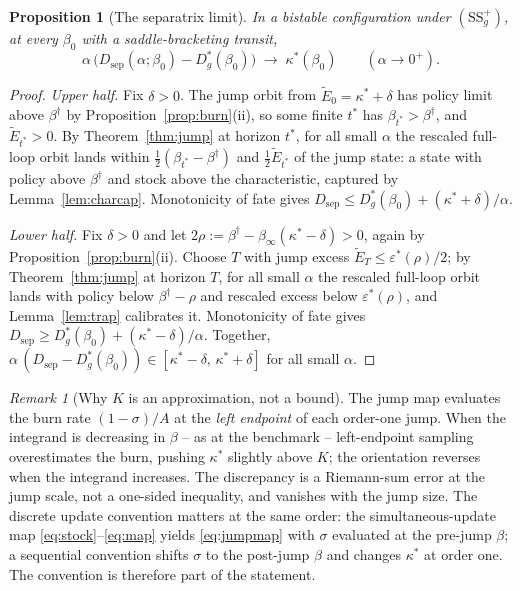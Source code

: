 \documentclass[11pt]{article}
\newtheorem{proposition}[theorem]{Proposition}
\theoremstyle{definition}
\theoremstyle{remark}
\newtheorem{remark}[theorem]{Remark}
\numberwithin{equation}{section}
\begin{document}
\begin{proposition}[The separatrix limit]\label{prop:seplimit}
In a bistable configuration under $(\mathrm{SS}^+_g)$, at every $\beta_0$ with a saddle-bracketing transit,
\[
\alpha\,\bigl(D_{\mathrm{sep}}(\alpha;\beta_0)-D^\ast_g(\beta_0)\bigr)\;\longrightarrow\;\kappa^\ast(\beta_0)
\qquad (\alpha \to 0^+).
\]
\end{proposition}
\begin{proof}
\emph{Upper half.} Fix $\delta > 0$. The jump orbit from $\tilde E_0 = \kappa^\ast+\delta$ has policy limit above $\beta^\dagger$ by Proposition~\ref{prop:burn}(ii), so some finite $t^\ast$ has $\beta_{t^\ast} > \beta^\dagger$, and $\tilde E_{t^\ast} > 0$. By Theorem~\ref{thm:jump} at horizon $t^\ast$, for all small $\alpha$ the rescaled full-loop orbit lands within $\tfrac12(\beta_{t^\ast}-\beta^\dagger)$ and $\tfrac12\tilde E_{t^\ast}$ of the jump state: a state with policy above $\beta^\dagger$ and stock above the characteristic, captured by Lemma~\ref{lem:charcap}. Monotonicity of fate gives $D_{\mathrm{sep}} \le D^\ast_g(\beta_0)+(\kappa^\ast+\delta)/\alpha$.

\emph{Lower half.} Fix $\delta > 0$ and let $2\rho := \beta^\dagger - \beta_\infty(\kappa^\ast-\delta) > 0$, again by Proposition~\ref{prop:burn}(ii). Choose $T$ with jump excess $\tilde E_T \le \varepsilon^\ast(\rho)/2$; by Theorem~\ref{thm:jump} at horizon $T$, for all small $\alpha$ the rescaled full-loop orbit lands with policy below $\beta^\dagger-\rho$ and rescaled excess below $\varepsilon^\ast(\rho)$, and Lemma~\ref{lem:trap} calibrates it. Monotonicity of fate gives $D_{\mathrm{sep}} \ge D^\ast_g(\beta_0)+(\kappa^\ast-\delta)/\alpha$. Together, $\alpha\,(D_{\mathrm{sep}}-D^\ast_g(\beta_0)) \in [\kappa^\ast-\delta,\, \kappa^\ast+\delta]$ for all small $\alpha$.
\end{proof}

\begin{remark}[Why $K$ is an approximation, not a bound]\label{rem:Knotbound}
The jump map evaluates the burn rate $(1-\sigma)/A$ at the \emph{left endpoint} of each order-one jump. When the integrand is decreasing in $\beta$ -- as at the benchmark -- left-endpoint sampling overestimates the burn, pushing $\kappa^\ast$ slightly above $K$; the orientation reverses when the integrand increases. The discrepancy is a Riemann-sum error at the jump scale, not a one-sided inequality, and vanishes with the jump size. The discrete update convention matters at the same order: the simultaneous-update map \eqref{eq:stock}--\eqref{eq:map} yields \eqref{eq:jumpmap} with $\sigma$ evaluated at the pre-jump $\beta$; a sequential convention shifts $\sigma$ to the post-jump $\beta$ and changes $\kappa^\ast$ at order one. The convention is therefore part of the statement.
\end{remark}
\end{document}

